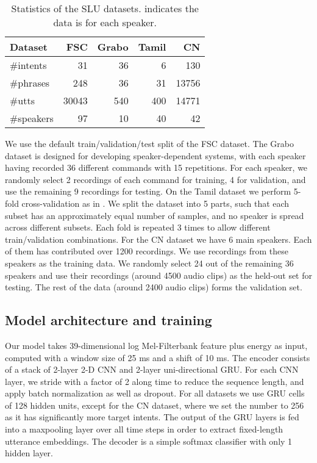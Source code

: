 \documentclass[a4paper]{article}
\begin{document}
	\begin{table}
		\caption{Statistics of the SLU datasets.  indicates the data is for each speaker.}
		\label{tab:dataset}
		\centering
		\begin{tabular}{l|rrrr}
			\toprule
			Dataset & FSC & Grabo & Tamil & CN\\
			\midrule
			\#intents & 31 & 36 & 6 & 130\\
			\#phrases & 248 & 36 & 31 & 13756 \\
			\#utts & 30043 & 540 & 400 & 14771\\
			\#speakers & 97 & 10\hspace{1ex} & 40 & 42 \\
			\bottomrule
		\end{tabular}
	\end{table}
	
	We use the default train/validation/test split of the FSC dataset. The Grabo dataset is designed for developing speaker-dependent systems, with each speaker having recorded 36 different commands with 15 repetitions. For each speaker, we randomly select 2 recordings of each command for training, 4 for validation, and use the remaining 9 recordings for testing. On the Tamil dataset we perform 5-fold cross-validation  as in \cite{karunanayake-etal-2019-transfer}. We split the dataset into 5 parts, such that each subset has an approximately equal number of samples, and no speaker is spread across different subsets. Each fold is repeated 3 times to allow different train/validation combinations. For the CN dataset we have 6 main speakers. Each of them has contributed over 1200 recordings. We use recordings from these speakers as the training data. We randomly select 24 out of the remaining 36 speakers and use their recordings (around 4500 audio clips) as the held-out set for testing. The rest of the data (around 2400 audio clips) forms the validation set.
	
	\subsection{Model architecture and training}
	Our model takes 39-dimensional log Mel-Filterbank feature plus energy as input, computed with a window size of 25 ms and a shift of 10 ms. The encoder consists of a stack of 2-layer \mbox{2-D} CNN  and 2-layer uni-directional GRU. For each CNN layer, we stride with a factor of 2 along time to reduce the sequence length, and apply batch normalization as well as dropout. For all datasets we use GRU cells of 128 hidden units, except for the CN dataset, where we set the number to 256 as it has significantly more target intents. The output of the GRU layers is fed into a maxpooling layer over all time steps in order to extract fixed-length utterance embeddings. The decoder is a simple softmax classifier with only 1 hidden layer.
	
\end{document}

